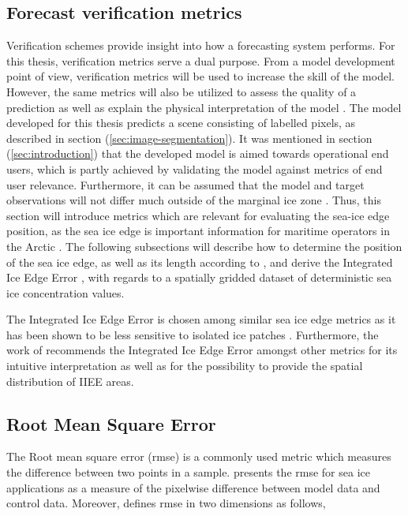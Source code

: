 \documentclass[../main/thesis.tex]{subfiles}
\begin{document}
\subsection{Forecast verification metrics}
Verification schemes provide insight into how a forecasting system performs. For this thesis, verification metrics serve a dual purpose. From a model development point of view, verification metrics will be used to increase the skill of the model. However, the same metrics will also be utilized to assess the quality of a prediction as well as explain the physical interpretation of the model \citep{Casati2008}. The model developed for this thesis predicts a scene consisting of labelled pixels, as described in section (\ref{sec:image-segmentation}). It was mentioned in section (\ref{sec:introduction}) that the developed model is aimed towards operational end users, which is partly achieved by validating the model against metrics of end user relevance. Furthermore, it can be assumed that the model and target observations will not differ much outside of the marginal ice zone \citep{Fritzner2020}. Thus, this section will introduce metrics which are relevant for evaluating the sea-ice edge position, as the sea ice edge is important information for maritime operators in the Arctic \citep{Melsom2019}. The following subsections will describe how to determine the position of the sea ice edge, as well as its length according to \citet{Melsom2019}, and derive the Integrated Ice Edge Error \citep{Goessling2016}, with regards to a spatially gridded dataset of deterministic sea ice concentration values.

The Integrated Ice Edge Error is chosen among similar sea ice edge metrics \citep{Melsom2019, Dukhovskoy2015} as it has been shown to be less sensitive to isolated ice patches \citep{Palerme2019}. Furthermore, the work of \citet{Melsom2019} recommends the Integrated Ice Edge Error amongst other metrics for its intuitive interpretation as well as for the possibility to provide the spatial distribution of IIEE areas.

\subsection{Root Mean Square Error}
The Root mean square error (rmse) is a commonly used metric which measures the difference between two points in a sample. \citet{Dukhovskoy2015} presents the rmse for sea ice applications as a measure of the pixelwise difference between model data and control data. Moreover, \citet{Dukhovskoy2015} defines rmse in two dimensions as follows,
\end{document}
